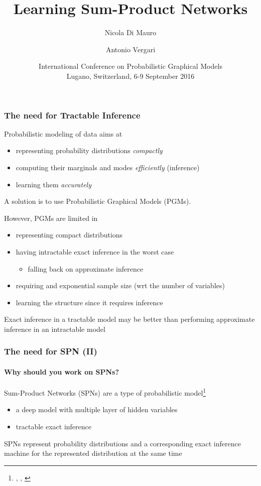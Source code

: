 \documentclass[10pt, t, xcolor={usenames,dvipsnames,svgnames}, compress]{beamer}
\title{Learning Sum-Product Networks}
\author{\small Nicola Di Mauro \and Antonio Vergari}
\date{\scriptsize International Conference on Probabilistic Graphical Models\\
 Lugano, Switzerland, 6-9 September 2016}
\institute{\scriptsize Università degli Studi di Bari}
\newcommand{\customcite}[1]{\footnote{\scriptsize \citeauthor{#1}, \citetitle{#1}, \citeyear{#1}}}
\begin{document}
\begin{frame}[c]
  \titlepage
\end{frame}

\begin{frame}
\frametitle{The need for Tractable Inference}

Probabilistic modeling of data aims at
\begin{itemize}
  \item representing probability distributions \emph{compactly}
  \item computing their marginals and modes \emph{efficiently} (inference)
  \item learning them \emph{accurately}
\end{itemize}
A solution is to use Probabilistic Graphical Models (PGMs).

However, PGMs are limited in
\begin{itemize}
\item representing compact distributions
\item having intractable exact inference in the worst case 
  \begin{itemize}
  \item falling back on approximate inference
  \end{itemize}
\item requiring and exponential sample size (wrt the number of variables)
\item learning the structure since it requires inference
\end{itemize}
Exact inference in a tractable model may be better than performing approximate
inference in an intractable model
\end{frame}

\begin{frame}
\frametitle{The need for SPN (II)}
  \framesubtitle{Why should you work on SPNs?}

Sum-Product Networks (SPNs) are a type of probabilistic model\customcite{Poon2011}
\begin{itemize}
\item a deep model with multiple layer of hidden variables
\item tractable exact inference 
\end{itemize}
SPNs represent probability distributions and a corresponding exact inference
machine for the represented distribution at the same time 
\end{frame}
\end{document}
